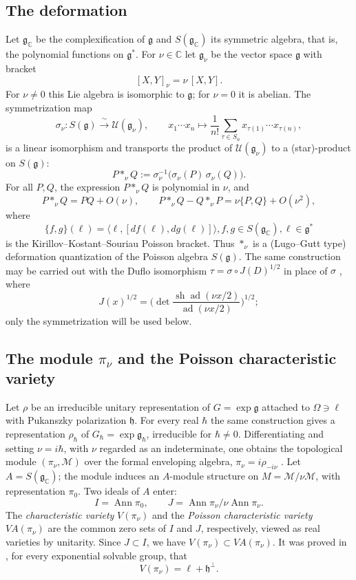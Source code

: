 \documentclass[11pt]{amsart}
\theoremstyle{plain}
\theoremstyle{definition}
\theoremstyle{remark}
\newcommand{\g}{\mathfrak g}
\newcommand{\h}{\mathfrak h}
\newcommand{\CC}{\mathbb C}
\newcommand{\Cal}[1]{\mathcal{#1}}
\newcommand{\ad}{\operatorname{ad}}
\newcommand{\Ann}{\operatorname{Ann}}
\newcommand{\VA}{V\!A}
\begin{document}
	\subsection{The deformation}\label{subsect:deformation}
	
	Let $\g_{\CC}$ be the complexification of $\g$ and $S(\g_{\CC})$ its symmetric algebra, that is, the polynomial functions on $\g^*$. For $\nu\in\CC$ let $\g_\nu$ be the vector space $\g$ with bracket
	\[
	[X,Y]_\nu=\nu\,[X,Y].
	\]
	For $\nu\neq0$ this Lie algebra is isomorphic to $\g$; for $\nu=0$ it is abelian. The symmetrization map
	\[
	\sigma_\nu:S(\g)\xrightarrow{\ \sim\ }\mathcal U(\g_\nu),\qquad
	x_1\cdots x_n\longmapsto\frac1{n!}\sum_{\tau\in S_n}x_{\tau(1)}\cdots x_{\tau(n)},
	\]
	is a linear isomorphism and transports the product of $\mathcal U(\g_\nu)$ to a (star)-product on $S(\g)$:
	\begin{equation}\label{star}
		P*_\nu Q:=\sigma_\nu^{-1}\big(\sigma_\nu(P)\,\sigma_\nu(Q)\big).
	\end{equation}
	For all $P,Q$, the expression $P*_\nu Q$ is polynomial in $\nu$, and
	\[
	P*_\nu Q=PQ+O(\nu),\qquad P*_\nu Q-Q*_\nu P=\nu\{P,Q\}+O(\nu^2),
	\]
	where $$\{f,g\}(\ell)=\langle\ell,[df(\ell),dg(\ell)]\rangle, f,g\in S(\g_{\CC}), \ell\in \g^*$$
	is the Kirillov--Kostant--Souriau Poisson bracket. Thus $*_\nu$ is a (Lugo--Gutt type) deformation quantization of the Poisson algebra $S(\g)$. The same construction may be carried out with the Duflo isomorphism $\tau=\sigma\circ J(D)^{1/2}$ in place of $\sigma$ \cite{18}, where $$J(x)^{1/2}=\big(\det\frac{\operatorname{sh}\ad(\nu x/2)}{\ad(\nu x/2)}\big)^{1/2};$$ only the symmetrization will be used below.
	
	\subsection{The module $\pi_\nu$ and the Poisson characteristic variety}
	
	Let $\rho$ be an irreducible unitary representation of $G=\exp\g$ attached to $\Omega\ni\ell$ with Pukanszky polarization $\h$. For every real $\hbar$ the same construction gives a representation $\rho_\hbar$ of $G_\hbar=\exp\g_\hbar$, irreducible for $\hbar\neq0$. Differentiating and setting $\nu=i\hbar$, with $\nu$ regarded as an indeterminate, one obtains the topological module $(\pi_\nu,\Cal M)$ over the formal enveloping algebra, $\pi_\nu=i\rho_{-i\nu}$ \cite[\S3]{BDM05}. Let $A=S(\g_{\CC})$; the module induces an $A$-module structure on $M=\Cal M/\nu\Cal M$, with representation $\pi_0$. Two ideals of $A$ enter:
	\[
	I=\Ann\pi_0,\qquad J=\Ann\pi_\nu/\nu\Ann\pi_\nu .
	\]
	The \emph{characteristic variety} $V(\pi_\nu)$ and the \emph{Poisson characteristic variety} $\VA(\pi_\nu)$ are the common zero sets of $I$ and $J$, respectively, viewed as real varieties by unitarity. Since $J\subset I$, we have $V(\pi_\nu)\subset\VA(\pi_\nu)$. It was proved in \cite[Th\'eor\`eme~5.3.1]{BDM05}, for every exponential solvable group, that
	\[
	V(\pi_\nu)=\ell+\h^\perp .
	\]
	
\end{document}
